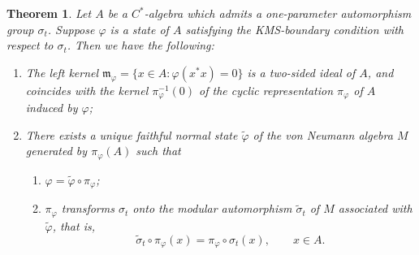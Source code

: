 \documentclass[12pt,b5paper,twoside]{article}
\theoremstyle{takesaki}
\newtheorem{theorem}{Theorem}[section]
\numberwithin{equation}{section}
\begin{document}
\begin{theorem}\label{thm:13.3}
Let $A$ be a $C^*$-algebra which admits a one-parameter automorphism
group $\sigma_t$.  Suppose $\varphi$ is a state of $A$ satisfying the
KMS-boundary condition with respect to $\sigma_t$.  Then we have the
following:
\begin{enumerate}[label=$\arabic*^\circ$]
 \item The left kernel
 $\mathfrak m_\varphi=\{x\in A:\varphi(x^*x)=0\}$ is a two-sided
 ideal of $A$, and coincides with the kernel $\pi_\varphi^{-1}(0)$ of
 the cyclic representation $\pi_\varphi$ of $A$ induced by
 $\varphi$;
 \item There exists a unique faithful normal state $\widetilde\varphi$
 of the
 von Neumann algebra $M$ generated by $\pi_\varphi(A)$ such that
 \begin{enumerate}[label=(\roman*)]
  \item $\varphi=\widetilde\varphi\circ\pi_\varphi$;
  \item $\pi_\varphi$ transforms $\sigma_t$ onto the modular
  automorphism $\widetilde\sigma_t$ of $M$ associated with
  $\widetilde\varphi$, that is,
  \[
   \widetilde\sigma_t\circ\pi_\varphi(x)
   =\pi_\varphi\circ\sigma_t(x),
   \qquad x\in A.
  \]
 \end{enumerate}
\end{enumerate}
\end{theorem}
\end{document}

